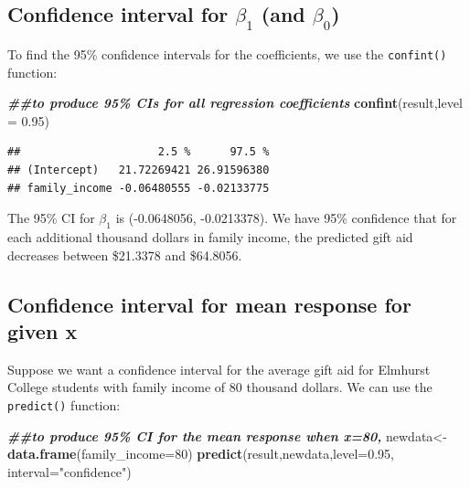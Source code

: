 \documentclass[
]{book}
\newenvironment{Shaded}{\begin{snugshade}}{\end{snugshade}}
\newcommand{\AttributeTok}[1]{\textcolor[rgb]{0.13,0.29,0.53}{#1}}
\newcommand{\DecValTok}[1]{\textcolor[rgb]{0.00,0.00,0.81}{#1}}
\newcommand{\DocumentationTok}[1]{\textcolor[rgb]{0.56,0.35,0.01}{\textbf{\textit{#1}}}}
\newcommand{\FloatTok}[1]{\textcolor[rgb]{0.00,0.00,0.81}{#1}}
\newcommand{\FunctionTok}[1]{\textcolor[rgb]{0.13,0.29,0.53}{\textbf{#1}}}
\newcommand{\NormalTok}[1]{#1}
\newcommand{\OtherTok}[1]{\textcolor[rgb]{0.56,0.35,0.01}{#1}}
\newcommand{\StringTok}[1]{\textcolor[rgb]{0.31,0.60,0.02}{#1}}
\begin{document}
\subsection*{\texorpdfstring{Confidence interval for \(\beta_1\) (and \(\beta_0\))}{Confidence interval for \textbackslash beta\_1 (and \textbackslash beta\_0)}}\label{confidence-interval-for-beta_1-and-beta_0}

To find the 95\% confidence intervals for the coefficients, we use the \texttt{confint()} function:

\begin{Shaded}
\begin{Highlighting}[]
\DocumentationTok{\#\#to produce 95\% CIs for all regression coefficients}
\FunctionTok{confint}\NormalTok{(result,}\AttributeTok{level =} \FloatTok{0.95}\NormalTok{)}
\end{Highlighting}
\end{Shaded}

\begin{verbatim}
##                     2.5 %      97.5 %
## (Intercept)   21.72269421 26.91596380
## family_income -0.06480555 -0.02133775
\end{verbatim}

The 95\% CI for \(\beta_1\) is (-0.0648056, -0.0213378). We have 95\% confidence that for each additional thousand dollars in family income, the predicted gift aid decreases between \$21.3378 and \$64.8056.

\subsection*{Confidence interval for mean response for given x}\label{confidence-interval-for-mean-response-for-given-x}

Suppose we want a confidence interval for the average gift aid for Elmhurst College students with family income of 80 thousand dollars. We can use the \texttt{predict()} function:

\begin{Shaded}
\begin{Highlighting}[]
\DocumentationTok{\#\#to produce 95\% CI for the mean response when x=80, }
\NormalTok{newdata}\OtherTok{\textless{}{-}}\FunctionTok{data.frame}\NormalTok{(}\AttributeTok{family\_income=}\DecValTok{80}\NormalTok{)}
\FunctionTok{predict}\NormalTok{(result,newdata,}\AttributeTok{level=}\FloatTok{0.95}\NormalTok{, }\AttributeTok{interval=}\StringTok{"confidence"}\NormalTok{)}
\end{Highlighting}
\end{Shaded}
\end{document}
